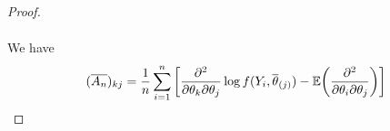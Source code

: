 \begin{proof}
\begin{align}
  \end{align} 

  We have
  \begin{align}
    \label{eq:66}
    (\overline{A_{n}})_{kj} = \frac{1}{n} \sum_{i=1}^{n} \left[
    \frac{\partial^{2}}{\partial \theta_{k} \partial \theta_{j}} \log
    f(Y_{i}, \overline{\theta}_{(j)}) -
    \E{\frac{\partial^{2}}{\partial \theta_{i} \partial \theta_{j}}} \right]
  \end{align} 

  
\end{proof}


